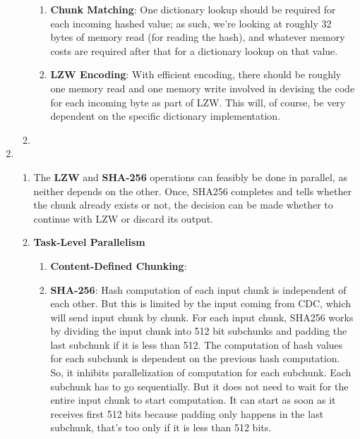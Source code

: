 \documentclass{article}
\begin{document}
\begin{enumerate}
\begin{enumerate}[label=(\alph*)]
\begin{enumerate}[label=(\roman*)]
\item%
\textbf{Chunk Matching}:\newline
One dictionary lookup should be required for each incoming hashed value; as such, we're looking at roughly 32 bytes of memory read (for reading the hash), and whatever memory costs are required after that for a dictionary lookup on that value.

\item%
\textbf{LZW Encoding}:\newline
With efficient encoding, there should be roughly one memory read and one memory write involved in devising the code for each incoming byte as part of LZW. This will, of course, be very dependent on the specific dictionary implementation.

\end{enumerate}%

\item%

\end{enumerate}%

\item%
\begin{enumerate}[label=(\alph*)]
\item%
The \textbf{LZW} and \textbf{SHA-256} operations can feasibly be done in parallel, as neither depends on the other. 
Once, SHA256 completes and tells whether the chunk already exists or not, the decision can be made whether to continue with LZW or discard its output.  
\item%
\textbf{Task-Level Parallelism}
\begin{enumerate}[label=(\roman*)]
\item%
\textbf{Content-Defined Chunking}:\newline

\item%
\textbf{SHA-256}:\newline
Hash computation of each input chunk is independent of each other. But this is limited by the input coming from CDC, which will send input chunk by chunk.
For each input chunk, SHA256 works by dividing the input chunk into 512 bit subchunks and padding the last subchunk if it is less than 512. The computation of hash values for each subchunk 
is dependent on the previous hash computation. So, it inhibits parallelization of computation for each subchunk. Each subchunk has to go sequentially. But it does not need to wait for 
the entire input chunk to start computation. It can start as soon as it receives first 512 bits because padding only happens in the last subchunk, that's too only if it is less than 512 bits. 


\end{enumerate}
\end{enumerate}
\end{enumerate}
\end{document}
